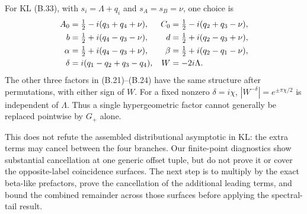 For KL (B.33), with $s_i=\Lambda+q_i$ and $s_A=s_B=\nu$, one choice is
\begin{align}
 A_0&=\tfrac12-i(q_3+q_4+\nu),&
 C_0&=\tfrac12-i(q_2+q_3-\nu),\notag\\
 b&=\tfrac12+i(q_4-q_3-\nu),&
 d&=\tfrac12+i(q_2-q_3+\nu),\notag\\
 \alpha&=\tfrac12+i(q_4-q_3+\nu),&
 \beta&=\tfrac12+i(q_2-q_1-\nu),\notag\\
 \delta&=i(q_1-q_2+q_3-q_4),&W&=-2i\Lambda.
 \label{eq:endpoint-B33-map}
\end{align}
The other three factors in (B.21)--(B.24) have the same structure after
permutations, with either sign of $W$. For a fixed nonzero
$\delta=i\chi$, $|W^{-\delta}|=e^{\pm\pi\chi/2}$ is independent of
$\Lambda$. Thus a single hypergeometric factor cannot generally be
replaced pointwise by $G_+$ alone.

This does not refute the assembled distributional asymptotic in KL:
the extra terms may cancel between the four branches. Our finite-point
diagnostics show substantial cancellation at one generic offset tuple,
but do not prove it or cover the opposite-label coincidence surfaces.
The next step is to multiply by the exact beta-like prefactors, prove the
cancellation of the additional leading terms, and bound the combined
remainder across those surfaces before applying the spectral-tail result.
